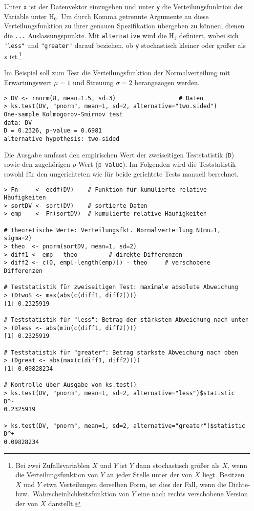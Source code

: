 Unter \lstinline!x! ist der Datenvektor einzugeben und unter \lstinline!y! die Verteilungsfunktion der Variable unter $\text{H}_{0}$. Um durch Komma getrennte Argumente an diese Verteilungsfunktion zu ihrer genauen Spezifikation übergeben zu können, dienen die \lstinline!...! Auslassungspunkte. Mit \lstinline!alternative! wird die $\text{H}_{1}$ definiert, wobei sich \lstinline!"less"! und \lstinline!"greater"! darauf beziehen, ob \lstinline!y! stochastisch kleiner oder größer als \lstinline!x! ist.\footnote{\label{ftn:stochDom}Bei zwei Zufallsvariablen $X$ und $Y$ ist $Y$ dann stochastisch größer als $X$, wenn die Verteilungsfunktion von $Y$ an jeder Stelle unter der von $X$ liegt. Besitzen $X$ und $Y$ etwa Verteilungen derselben Form, ist dies der Fall, wenn die Dichte- bzw.\ Wahrscheinlichkeitsfunktion von $Y$ eine nach rechts verschobene Version der von $X$ darstellt.}

Im Beispiel soll zum Test die Verteilungsfunktion der Normalverteilung mit Erwartungswert $\mu=1$ und Streuung $\sigma=2$ herangezogen werden.
\begin{lstlisting}
> DV <- rnorm(8, mean=1.5, sd=3)                  # Daten
> ks.test(DV, "pnorm", mean=1, sd=2, alternative="two.sided")
One-sample Kolmogorov-Smirnov test
data: DV
D = 0.2326, p-value = 0.6981
alternative hypothesis: two-sided
\end{lstlisting}

Die Ausgabe umfasst den empirischen Wert der zweiseitigen Teststatistik (\lstinline!D!) sowie den zugehörigen $p$-Wert (\lstinline!p-value!). Im Folgenden wird die Teststatistik sowohl für den ungerichteten wie für beide gerichtete Tests manuell berechnet.
\begin{lstlisting}
> Fn     <- ecdf(DV)    # Funktion für kumulierte relative Häufigkeiten
> sortDV <- sort(DV)    # sortierte Daten
> emp    <- Fn(sortDV)  # kumulierte relative Häufigkeiten

# theoretische Werte: Verteilungsfkt. Normalverteilung N(mu=1, sigma=2)
> theo  <- pnorm(sortDV, mean=1, sd=2)
> diff1 <- emp - theo         # direkte Differenzen
> diff2 <- c(0, emp[-length(emp)]) - theo     # verschobene Differenzen

# Teststatistik für zweiseitigen Test: maximale absolute Abweichung
> (DtwoS <- max(abs(c(diff1, diff2))))
[1] 0.2325919

# Teststatistik für "less": Betrag der stärksten Abweichung nach unten
> (Dless <- abs(min(c(diff1, diff2))))
[1] 0.2325919

# Teststatistik für "greater": Betrag stärkste Abweichung nach oben
> (Dgreat <- abs(max(c(diff1, diff2))))
[1] 0.09828234

# Kontrolle über Ausgabe von ks.test()
> ks.test(DV, "pnorm", mean=1, sd=2, alternative="less")$statistic
D^-
0.2325919

> ks.test(DV, "pnorm", mean=1, sd=2, alternative="greater")$statistic
D^+
0.09828234
\end{lstlisting}

